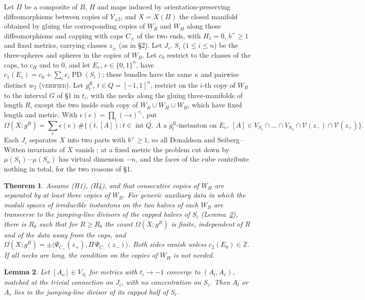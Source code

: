 \documentclass[10pt]{amsart}
\numberwithin{equation}{section}
\theoremstyle{compact}
\newtheorem{theorem}{Theorem}[section]
\newtheorem{lemma}[theorem]{Lemma}
\newcommand{\Z}{\mathbb Z}
\newcommand{\PD}{\operatorname{PD}}
\newcommand{\cV}{\mathcal V}
\newcommand{\ver}{\textsc{verified}}
\begin{document}
Let $\Pi$ be a composite of $B$, $H$ and maps induced by orientation-preserving
diffeomorphisms between copies of $Y_{\pm2}$, and $X=X(\Pi)$ the closed manifold
obtained by gluing the corresponding copies of $W_B$ and $W_H$ along those
diffeomorphisms and capping with caps $C_\pm$ of the two ends, with $H_1=0$,
$b^+\ge1$ and fixed metrics, carrying classes $z_\pm$ (as in \S2). Let $J_i$, $S_i$ ($1\le i\le n$) be the three-spheres and spheres in
the copies of $W_B$. Let $c_0$ restrict to the classes of the caps, to $c_H$ and to
$0$, and let $E_e$, $e\in\{0,1\}^n$, have $c_1(E_e)=c_0+\sum_ie_i\PD(S_i)$; these
bundles have the same $\kappa$ and pairwise distinct $w_2$ (\ver). Let $g^R_t$,
$t\in Q=[-1,1]^n$, restrict on the $i$-th copy of $W_B$ to the interval $G$ of
\S1 in $t_i$, with the necks along the gluing three-manifolds of length $R$,
except the two inside each copy of $W_B\cup W_H\cup W_B$, which have fixed length
and metric. With $\epsilon(e)=\prod_i(-\epsilon)^{e_i}$, put
\[
\Omega(X;g^R)=\sum_e\epsilon(e)\,\#\bigl\{(t,[A]):t\in\operatorname{int}Q,\
A\text{ a $g^R_t$-instanton on }E_e,\
[A]\in V_{S_1}\cap\dots\cap V_{S_n}\cap\cV(z_-)\cap\cV(z_+)\bigr\}.
\]
Each $J_i$ separates $X$ into two parts with $b^+\ge1$, so all Donaldson and
Seiberg--Witten invariants of $X$ vanish \cite{D90}; at a fixed metric the
problem cut down by $\mu(S_1)\cdots\mu(S_n)$ has virtual dimension $-n$, and the
faces of the cube contribute nothing in total, for the two reasons of \S1.

\begin{theorem}\label{thm:glue}
Assume \textup{(H1)}, \textup{(H4)}, and that consecutive copies of $W_H$ are
separated by at least three copies of $W_B$. For generic auxiliary data in
which the moduli spaces of irreducible instantons on the two halves of each
$W_B$ are transverse to the jumping-line divisors of the capped halves of $S_i$
(Lemma~\ref{lem:nodal}), there is $R_0$ such that for $R\ge R_0$ the count
$\Omega(X;g^R)$ is finite, independent of $R$ and of the data away from the
caps, and $\Omega(X;g^R)=\pm\langle\Psi_{C_+}(z_+),\Pi\,\Psi_{C_-}(z_-)\rangle$. Both sides
vanish unless $c_2(E_0)\in\Z$. If all necks are long, the condition on the
copies of $W_H$ is not needed.
\end{theorem}

\begin{lemma}\label{lem:nodal}
Let $[A_\nu]\in V_{S_i}$ for metrics with $t_i\to-1$ converge to $(A_l,A_r)$,
matched at the trivial connection on $J_i$, with no concentration on $S_i$. Then
$A_l$ or $A_r$ lies in the jumping-line divisor of its capped half of $S_i$.
\end{lemma}
\end{document}

